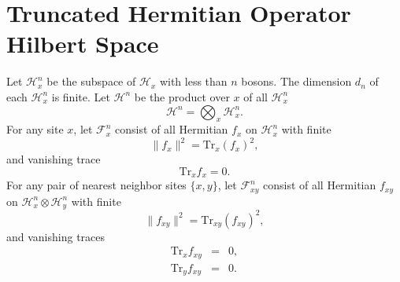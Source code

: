 \documentclass[12pt,amsmath,amssymb,onecolumn]{revtex4-2}
\begin{document}
{}



\appendix

\section{\label{app:operatorspace} Truncated Hermitian Operator Hilbert Space}



Let $\mathcal{H}_x^n$ be the subspace of $\mathcal{H}_x$ with
less than $n$ bosons. The dimension $d_n$ of
each $\mathcal{H}_x^n$ is finite.
Let
$\mathcal{H}^n$ be the product over $x$ of all
$\mathcal{H}^n_x$
\begin{equation}
  \label{defPn}
  \mathcal{H}^n = \bigotimes_x \mathcal{H}_x^n.
  \end{equation}
For any site $x$, let $\mathcal{F}^n_x$ consist of all Hermitian $f_x$ on
$\mathcal{H}^n_x$ with finite
\begin{equation}
  \label{normfx}
  \parallel f_x \parallel ^ 2 = \mathrm{Tr}_x( f_x)^2,
\end{equation}
and vanishing trace 
\begin{equation}
  \label{trx0}
  \mathrm{Tr}_x f_x  = 0.
\end{equation}
For any pair of nearest neighbor sites $\{x, y\}$, let $\mathcal{F}^n_{xy}$ consist of all Hermitian $f_{xy}$ on
$\mathcal{H}^n_x \otimes \mathcal{H}^n_y$ with finite
\begin{equation}
  \label{normfxy}
  \parallel f_{xy} \parallel ^ 2 = \mathrm{Tr}_{xy}( f_{xy})^2,
\end{equation}
and vanishing traces 
\begin{subequations}
\begin{eqnarray}
  \label{trx1}
  \mathrm{Tr}_x f_{xy}  &=& 0, \\
  \label{try1}
  \mathrm{Tr}_y f_{xy}  &=& 0.
\end{eqnarray}
\end{subequations}
\end{document}

